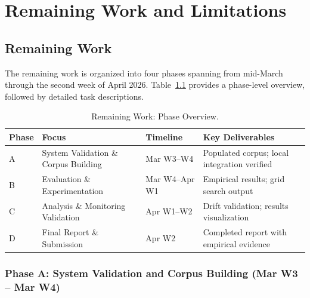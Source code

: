\documentclass[12pt,a4paper]{report}
\begin{document}
\chapter{Remaining Work and Limitations}

\section{Remaining Work}
\label{sec:remaining}

The remaining work is organized into four phases spanning from mid-March through the second week of April 2026. Table~\ref{tab:remaining_phases} provides a phase-level overview, followed by detailed task descriptions.

\begin{table}[H]
\caption{Remaining Work: Phase Overview.}
\label{tab:remaining_phases}
\centering
\begin{tabular}{p{0.8cm}p{4.2cm}p{2.5cm}p{5.0cm}}
\toprule
\textbf{Phase} & \textbf{Focus} & \textbf{Timeline} & \textbf{Key Deliverables} \\
\midrule
A & System Validation \& Corpus Building & Mar W3--W4 & Populated corpus; local integration verified \\
B & Evaluation \& Experimentation & Mar W4--Apr W1 & Empirical results; grid search output \\
C & Analysis \& Monitoring Validation & Apr W1--W2 & Drift validation; results visualization \\
D & Final Report \& Submission & Apr W2 & Completed report with empirical evidence \\
\bottomrule
\end{tabular}
\end{table}

\subsection{Phase A: System Validation and Corpus Building (Mar W3 -- Mar W4)}
\end{document}
